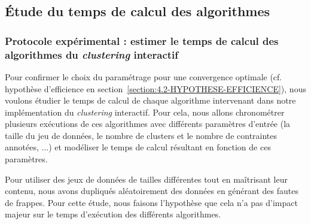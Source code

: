 	\subsection{Étude du temps de calcul des algorithmes}
	\label{section:4.3.1-ETUDE-COUTS-TEMPS-CALCUL}
	
		\subsubsection{Protocole expérimental : estimer le temps de calcul des algorithmes du \textit{clustering} interactif}
		
			Pour confirmer le choix du paramétrage pour une convergence optimale (cf. hypothèse d'efficience en section~\ref{section:4.2-HYPOTHESE-EFFICIENCE}), nous voulons étudier le temps de calcul de chaque algorithme intervenant dans notre implémentation du \textit{clustering} interactif.
			Pour cela, nous allons chronométrer plusieurs exécutions de ces algorithmes avec différents paramètres d'entrée (la taille du jeu de données, le nombre de clusters et le nombre de contraintes annotées, ...) et modéliser le temps de calcul résultant en fonction de ces paramètres.
			
			\begin{leftBarWarning}
				Pour utiliser des jeux de données de tailles différentes tout en maîtrisant leur contenu, nous avons dupliqués aléatoirement des données en générant des fautes de frappes. Pour cette étude, nous faisons l'hypothèse que cela n'a pas d'impact majeur sur le temps d'exécution des différents algorithmes.
			\end{leftBarWarning}
			
